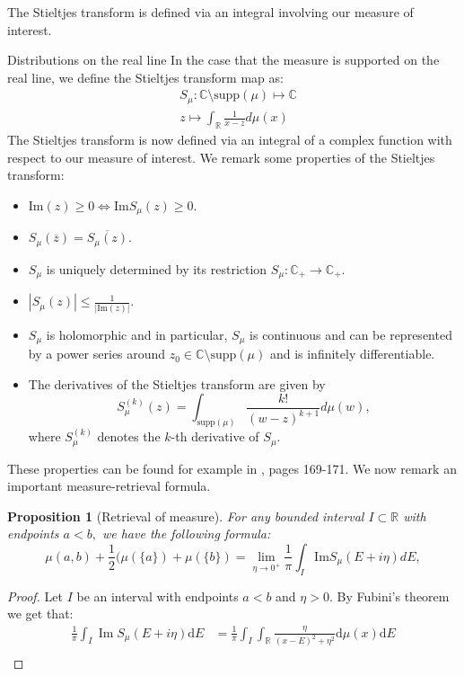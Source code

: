 \documentclass[11pt, a4paper, oneside]{book}
\numberwithin{equation}{chapter}
\newcommand{\beq}{\begin{equation}}
\newcommand{\eeq}{\end{equation}}
\newtheorem{prop}[thm]{Proposition}
\begin{document}
The Stieltjes transform is defined via an integral involving our measure of interest.

\begin{section}{Distributions on the real line} \label{S-Re}
In the case that the measure is supported on the real line, we define the Stieltjes transform map as:
%
\begin{align*}
&S_\mu: \mathbb{C} \setminus \mathrm{supp}(\mu) \mapsto \mathbb{C} \\
&z \mapsto \int_{\mathbb{R}} \frac{1}{x-z} d\mu(x)
\end{align*}
%
The Stieltjes transform is now defined via an integral of a complex function with respect to our measure of interest. We remark some properties of the Stieltjes transform:
%
\begin{itemize}
    \item $\mathrm{Im}(z)\geq 0 \Leftrightarrow \mathrm{Im} S_\mu (z) \geq 0.$
    \item $S_\mu(\overline{z}) = \overline{S_\mu (z) }.$
    \item $S_\mu$ is uniquely determined by its restriction $S_\mu : \mathbb{C}_+ \to \mathbb{C}_+.$
    \item $|S_\mu(z)|\leq \frac{1}{|\mathrm{Im}(z)|}$.
    \item $S_\mu$ is holomorphic and in particular, $S_\mu$ is continuous and can be represented by a power series around $z_0 \in \mathbb{C}\setminus \mathrm{supp}(\mu)$ and is infinitely differentiable.
    \item The derivatives of the Stieltjes transform are given by
\[
S_\mu^{(k)}(z) = \int_{\mathrm{supp}(\mu)} \frac{k!}{(w-z)^{k+1}} d\mu(w),
\]
where $S_\mu^{(k)}$ denotes the $k$-th derivative of $S_\mu.$
\end{itemize}
%
These properties can be found for example in \cite{tao2023topics}, pages 169-171. We now remark an important measure-retrieval formula.
%
\begin{prop}[Retrieval of measure] For any bounded interval $I \subset \mathbb{R}$ with endpoints $a<b,$ we have the following formula:
\beq \label{retr1}
\mu(a,b) + \frac{1}{2} ( \mu(\{a\}) + \mu(\{b\} ) = \lim \limits_{\eta \to 0^+} \frac{1}{\pi} \int_I \mathrm{Im} S_\mu (E+i\eta) dE,
\eeq
\end{prop}
%
\begin{proof}
Let $I$ be an interval with endpoints $a<b$ and $\eta>0.$ By Fubini's theorem we get that:
\[
\begin{aligned}
\frac{1}{\pi} \int_I \operatorname{Im} S_\mu(E+i \eta) \mathrm{d} E &=\frac{1}{\pi} \int_I \int_{\mathbb{R}} \frac{\eta}{(x-E)^2+\eta^2} \mathrm{d} \mu (x) \mathrm{d} E \\

\end{aligned}\]
\end{proof}
\end{section}
\end{document}

